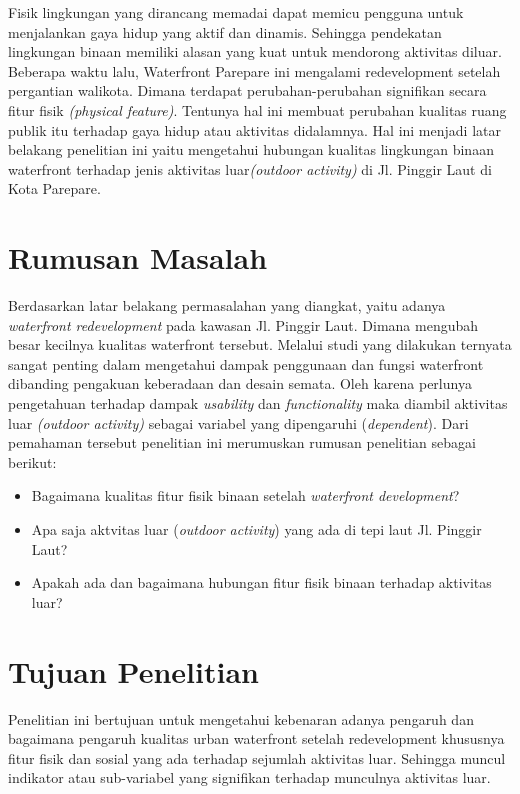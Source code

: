 \documentclass[../thesis.tex]{subfiles}
\begin{document}
Fisik lingkungan yang dirancang memadai dapat memicu pengguna untuk menjalankan gaya hidup yang aktif dan dinamis\citep{chang2020}. Sehingga pendekatan lingkungan binaan memiliki alasan yang kuat untuk mendorong aktivitas diluar.
Beberapa waktu lalu, Waterfront Parepare ini mengalami redevelopment setelah pergantian walikota. Dimana terdapat perubahan-perubahan signifikan secara fitur fisik \textit{(physical feature)}. Tentunya hal ini membuat perubahan kualitas ruang publik itu terhadap gaya hidup atau aktivitas didalamnya. Hal ini menjadi latar belakang penelitian ini yaitu mengetahui hubungan kualitas lingkungan binaan waterfront terhadap jenis aktivitas luar\textit{(outdoor activity)} di Jl. Pinggir Laut di Kota Parepare.




\section{Rumusan Masalah}
Berdasarkan latar belakang permasalahan yang diangkat, yaitu adanya \textit{waterfront redevelopment} pada kawasan Jl. Pinggir Laut. Dimana mengubah besar kecilnya kualitas waterfront tersebut. Melalui studi yang dilakukan ternyata sangat penting dalam mengetahui dampak penggunaan dan fungsi waterfront dibanding pengakuan keberadaan dan desain semata. Oleh karena perlunya pengetahuan terhadap dampak \textit{usability} dan \textit{functionality} maka diambil aktivitas luar \textit{(outdoor activity)} sebagai variabel yang dipengaruhi (\textit{dependent}). Dari pemahaman tersebut penelitian ini merumuskan rumusan penelitian sebagai berikut:


\begin{itemize}
	\item Bagaimana kualitas fitur fisik binaan setelah \textit{waterfront development}?
	\item Apa saja aktvitas luar (\textit{outdoor activity}) yang ada di tepi laut Jl. Pinggir Laut?
	\item Apakah ada dan bagaimana hubungan fitur fisik binaan terhadap aktivitas luar?
\end{itemize}

\section{Tujuan Penelitian}
Penelitian ini bertujuan untuk mengetahui kebenaran adanya pengaruh dan bagaimana pengaruh kualitas urban waterfront setelah redevelopment khususnya fitur fisik dan sosial yang ada terhadap sejumlah aktivitas luar. Sehingga muncul indikator atau sub-variabel yang signifikan terhadap munculnya aktivitas luar.
\end{document}
